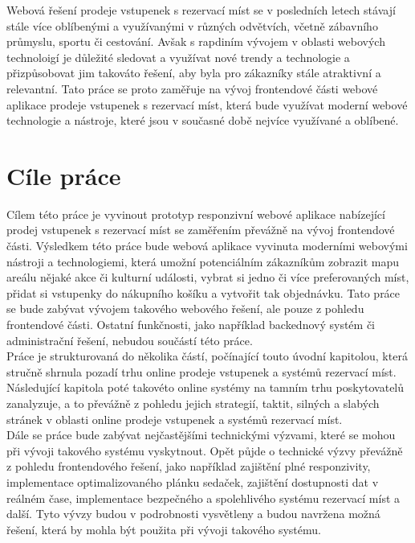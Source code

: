 Webová řešení prodeje vstupenek s rezervací míst se v posledních letech stávají stále více oblíbenými a využívanými v různých odvětvích, včetně zábavního průmyslu, sportu či cestování. Avšak s rapdiním vývojem v oblasti webových technoloigí je důležité sledovat a využívat nové trendy a technologie a přizpůsobovat jim takováto řešení, aby byla pro zákazníky stále atraktivní a relevantní. Tato práce se proto zaměřuje na vývoj frontendové části webové aplikace prodeje vstupenek s rezervací míst, která bude využívat moderní webové technologie a nástroje, které jsou v současné době nejvíce využívané a oblíbené.

\section*{Cíle práce}
\label{sec:uvod-cile-prace}
Cílem této práce je vyvinout prototyp responzivní webové aplikace nabízející prodej vstupenek s rezervací míst se zaměřením převážně na vývoj frontendové části. Výsledkem této práce bude webová aplikace vyvinuta moderními webovými nástroji a technologiemi, která umožní potenciálním zákazníkům zobrazit mapu areálu nějaké akce či kulturní události, vybrat si jedno či více preferovaných míst, přidat si vstupenky do nákupního košíku a vytvořit tak objednávku. Tato práce se bude zabývat vývojem takového webového řešení, ale pouze z pohledu frontendové části. Ostatní funkčnosti, jako například backednový systém či administrační řešení, nebudou součástí této práce.\\

Práce je strukturovaná do několika částí, počínající touto úvodní kapitolou, která stručně shrnula pozadí trhu online prodeje vstupenek a systémů rezervací míst. Následující kapitola poté takovéto online systémy na tamním trhu poskytovatelů zanalyzuje, a to převážně z pohledu jejich strategií, taktit, silných a slabých stránek v oblasti online prodeje vstupenek a systémů rezervací míst.\\

Dále se práce bude zabývat nejčastějšími technickými výzvami, které se mohou při vývoji takového systému vyskytnout. Opět půjde o technické výzvy převážně z pohledu frontendového řešení, jako například zajištění plné responzivity, implementace optimalizovaného plánku sedaček, zajištění dostupnosti dat v reálném čase, implementace bezpečného a spolehlivého systému rezervací míst a další. Tyto vývzy budou v podrobnosti vysvětleny a budou navržena možná řešení, která by mohla být použita při vývoji takového systému.\\

